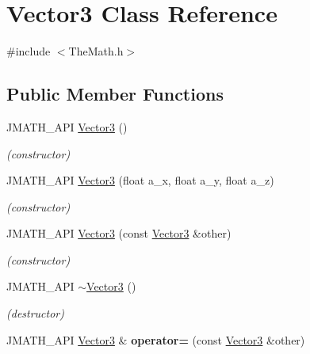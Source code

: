 \hypertarget{class_vector3}{\section{Vector3 Class Reference}
\label{class_vector3}
}


{\ttfamily \#include $<$The\+Math.\+h$>$}

\subsection*{Public Member Functions}
\begin{DoxyCompactItemize}
\item 
J\+M\+A\+T\+H\+\_\+\+A\+P\+I \hyperlink{class_vector3_a0f49191f7e001e7f7ae1cb49522118b4}{Vector3} ()
\begin{DoxyCompactList}\small\item\em (constructor) \end{DoxyCompactList}\item 
J\+M\+A\+T\+H\+\_\+\+A\+P\+I \hyperlink{class_vector3_aa6b6d42ca867d4a63588a172eb99c4cf}{Vector3} (float a\+\_\+x, float a\+\_\+y, float a\+\_\+z)
\begin{DoxyCompactList}\small\item\em (constructor) \end{DoxyCompactList}\item 
\hypertarget{class_vector3_aad6b7d343e46f9d930139ebf3195a886}{J\+M\+A\+T\+H\+\_\+\+A\+P\+I \hyperlink{class_vector3_aad6b7d343e46f9d930139ebf3195a886}{Vector3} (const \hyperlink{class_vector3}{Vector3} \&other)}\label{class_vector3_aad6b7d343e46f9d930139ebf3195a886}

\begin{DoxyCompactList}\small\item\em (constructor) \end{DoxyCompactList}\item 
\hypertarget{class_vector3_a5545e13e2e2861ece8f14b12a6a8101f}{J\+M\+A\+T\+H\+\_\+\+A\+P\+I \hyperlink{class_vector3_a5545e13e2e2861ece8f14b12a6a8101f}{$\sim$\+Vector3} ()}\label{class_vector3_a5545e13e2e2861ece8f14b12a6a8101f}

\begin{DoxyCompactList}\small\item\em (destructor) \end{DoxyCompactList}\item 
\hypertarget{class_vector3_a0e7eb0557486b19d8c2f38c6bbe0e068}{J\+M\+A\+T\+H\+\_\+\+A\+P\+I \hyperlink{class_vector3}{Vector3} \& {\bfseries operator=} (const \hyperlink{class_vector3}{Vector3} \&other)}\label{class_vector3_a0e7eb0557486b19d8c2f38c6bbe0e068}


\end{DoxyCompactItemize}
